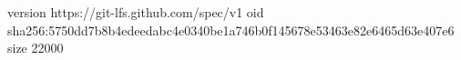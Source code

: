 version https://git-lfs.github.com/spec/v1
oid sha256:5750dd7b8b4edeedabc4e0340be1a746b0f145678e53463e82e6465d63e407e6
size 22000
